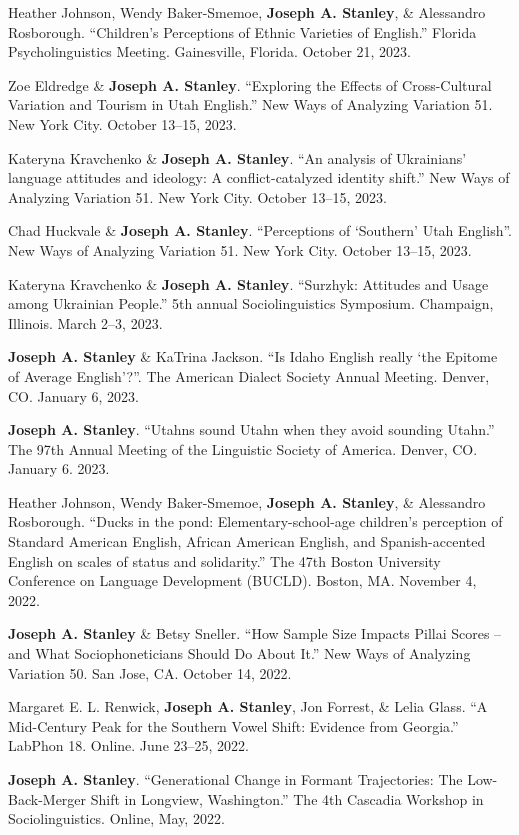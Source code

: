 \documentclass[
]{article}
\begin{document}
{Heather Johnson}, Wendy Baker-Smemoe, \textbf{Joseph A. Stanley}, \&
Alessandro Rosborough. ``Children's Perceptions of Ethnic Varieties of
English.'' Florida Psycholinguistics Meeting. Gainesville, Florida.
October 21, 2023.

{Zoe Eldredge} \& \textbf{Joseph A. Stanley}. ``Exploring the Effects of
Cross-Cultural Variation and Tourism in Utah English.'' New Ways of
Analyzing Variation 51. New York City. October 13--15, 2023.

{Kateryna Kravchenko} \& \textbf{Joseph A. Stanley}. ``An analysis of
Ukrainians' language attitudes and ideology: A conflict-catalyzed
identity shift.'' New Ways of Analyzing Variation 51. New York City.
October 13--15, 2023.

{Chad Huckvale} \& \textbf{Joseph A. Stanley}. ``Perceptions of
`Southern' Utah English''. New Ways of Analyzing Variation 51. New York
City. October 13--15, 2023.

{Kateryna Kravchenko} \& \textbf{Joseph A. Stanley}. ``Surzhyk:
Attitudes and Usage among Ukrainian People.'' 5th annual
Sociolinguistics Symposium. Champaign, Illinois. March 2--3, 2023.

\textbf{Joseph A. Stanley} \& {KaTrina Jackson}. ``Is Idaho English
really `the Epitome of Average English'?''. The American Dialect Society
Annual Meeting. Denver, CO. January 6, 2023.

\textbf{Joseph A. Stanley}. ``Utahns sound Utahn when they avoid
sounding Utahn.'' The 97th Annual Meeting of the Linguistic Society of
America. Denver, CO. January 6. 2023.

{Heather Johnson}, Wendy Baker-Smemoe, \textbf{Joseph A. Stanley}, \&
Alessandro Rosborough. ``Ducks in the pond: Elementary-school-age
children's perception of Standard American English, African American
English, and Spanish-accented English on scales of status and
solidarity.'' The 47th Boston University Conference on Language
Development (BUCLD). Boston, MA. November 4, 2022.

\textbf{Joseph A. Stanley} \& Betsy Sneller. ``How Sample Size Impacts
Pillai Scores -- and What Sociophoneticians Should Do About It.'' New
Ways of Analyzing Variation 50. San Jose, CA. October 14, 2022.

Margaret E. L. Renwick, \textbf{Joseph A. Stanley}, Jon Forrest, \&
Lelia Glass. ``A Mid-Century Peak for the Southern Vowel Shift: Evidence
from Georgia.'' LabPhon 18. Online. June 23--25, 2022.

\textbf{Joseph A. Stanley}. ``Generational Change in Formant
Trajectories: The Low-Back-Merger Shift in Longview, Washington.'' The
4th Cascadia Workshop in Sociolinguistics. Online, May, 2022.
\end{document}
